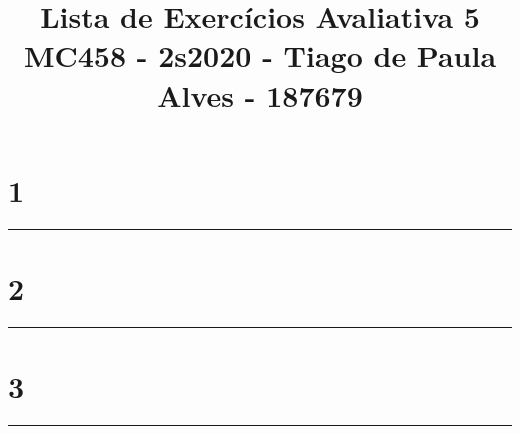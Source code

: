 \documentclass[a4paper, 14pt]{extarticle}
\title{\vspace{-2.5cm}\Large Lista de Exercícios Avaliativa 5 \\ \normalsize MC458 - 2s2020 - Tiago de Paula Alves - 187679}
\theoremstyle{plain}
\theoremstyle{definicao}
\newcommand{\docline}[1][\\]{%
    #1\noindent\rule{\textwidth}{0.4pt}%
    \pagebreak%
}
\begin{document}
    \maketitle
    \thispagestyle{empty}


    \section{1}
    \begingroup
        
    \endgroup

    \docline[]

    \section{2}
    \begingroup
        
    \endgroup

    \docline[]

    \section{3}
    \begingroup
        
    \endgroup

    \docline[]
\end{document}
